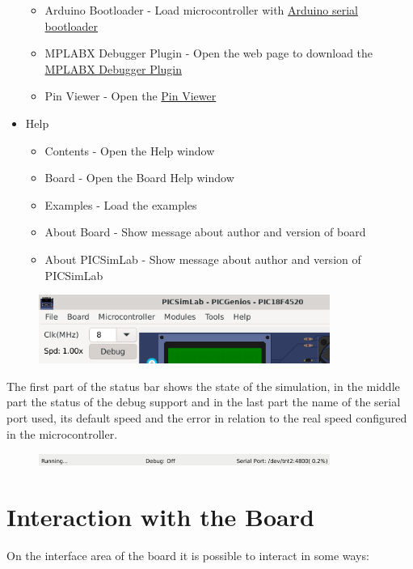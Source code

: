 \begin{itemize}
\begin{itemize}
 \item Arduino Bootloader - Load microcontroller with \hyperlink{def:aboot}{Arduino serial bootloader} 
 \item MPLABX Debugger Plugin - Open the web page to download the \hyperlink{def:mpdebug}{MPLABX Debugger Plugin} 
 \item Pin Viewer - Open the \hyperlink{def:pinv}{Pin Viewer} 
\end{itemize}
\item Help 
\begin{itemize}
 \item Contents - Open the Help window
 \item Board - Open the Board Help window
 \item Examples - Load the examples
 \item About Board - Show message about author and version of board
 \item About PICSimLab - Show message about author and version of PICSimLab
\end{itemize}
\end{itemize}


\begin{figure}[H]
\center
\includegraphics[width=0.85\textwidth]{img/int1.png} 
\end{figure} 

The first part of the status bar shows the state of the simulation, in the middle part the status of the debug support and in the last part the name of the serial port used, its default speed and the error in relation to the real speed configured in the microcontroller.

\begin{figure}[H]
\center
\includegraphics[width=0.85\textwidth]{img/int2.png} 
\end{figure} 


\section{Interaction with the Board}

On the interface area of the board it is possible to interact in some ways:

